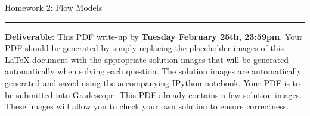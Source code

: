\documentclass{article}
\newcommand{\ruleskip}{\bigskip\hrule\bigskip}
\begin{document}
\pagestyle{myheadings} 

{\huge
\noindent Homework 2: Flow Models}
\ruleskip

{\bf Deliverable}: This PDF write-up by {\bf Tuesday February 25th, 23:59pm}.  Your PDF should be generated by simply replacing the placeholder images of this LaTeX document with the appropriate solution images that will be generated automatically when solving each question. The solution images are automatically generated and saved using the accompanying IPython notebook. Your PDF is to be submitted into Gradescope. This PDF already contains a few solution images.  These images will allow you to check your own solution to ensure correctness.


\vspace{.2in}

\end{document}
